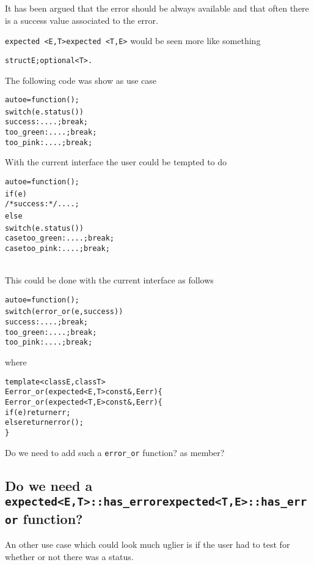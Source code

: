 \documentclass[a4paper,10pt]{article}
\newcommand{\cpp}[1]{\lstinline{#1}}
\newcommand{\suppress}[1]{\colorbox{suppress_color}{#1}}
\newcommand{\update}[1]{\colorbox{update_color}{#1}}
\begin{document}
It has been argued that the error should be always available and that often there is a success value associated to the error.

\suppress{\cpp{expected <E,T>}}\update{\cpp{expected <T,E>}} would be seen more like something  

\begin{alltt}
struct { E; optional<T> }. 
\end{alltt}

\noindent
The following code was show as use case

\begin{alltt}
auto e = function();
switch (e.status()) {
  success: ....; break;
  too_green: ....; break;
  too_pink: ....; break;
} 
\end{alltt}

\noindent
With the current interface the user could be tempted to do

\begin{alltt}
auto e = function();
if (e) {
  /*success:*/ ....;
} else {
  switch (e.status()) {
  case too_green: ....; break;
  case too_pink: ....; break;
  }
} 
\end{alltt}

\noindent
This could be done with the current interface as follows

\begin{alltt}
auto e = function();
switch (error_or(e, success)) {
  success: ....; break;
  too_green: ....; break;
  too_pink: ....; break;
} 
\end{alltt}

\noindent
where

\begin{alltt}
template <class E, class T>
\suppress{E error_or(expected<E,T> const&, E err) \{}
\update{E error_or(expected<T,E> const&, E err) \{}
  if(e) return err;
  else return error();
\}
\end{alltt}

\noindent
Do we need to add such a \cpp{error_or} function? as member? 

\subsection{Do we need a  \suppress{\cpp{expected<E,T>::has_error}}\update{\cpp{expected<T,E>::has_error}}  function?}

An other use case which could look much uglier is if the user had to test for whether or not there was a status.
\end{document}
